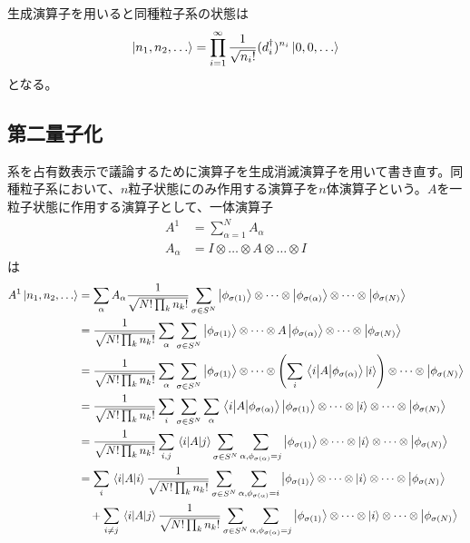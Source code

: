     生成演算子を用いると同種粒子系の状態は
        \[\ket{n_1, n_2, \dots} = \prod_{i = 1}^\infty \frac{1}{\sqrt{n_i!}} (d_i^\dagger)^{n_i} \ket{0, 0, \dots}\]
    となる。

\subsection{第二量子化}
    系を占有数表示で議論するために演算子を生成消滅演算子を用いて書き直す。同種粒子系において、$n$粒子状態にのみ作用する演算子を$n$体演算子という。$A$を一粒子状態に作用する演算子として、一体演算子
    \begin{align*}
        A^1 &= \sum_{\alpha = 1}^N A_\alpha\\
        A_\alpha &= I \otimes \dots \otimes A \otimes \dots \otimes I
    \end{align*}
    は
    \begin{align*}
        A^1\ket{n_1, n_2, \dots}
            &= \sum_\alpha A_\alpha \frac{1}{\sqrt{N! \prod_k n_k!}} \sum_{\sigma \in S^N} \ket{\phi_{\sigma(1)}} \otimes \dots \otimes \ket{\phi_{\sigma(\alpha)}} \otimes \dots \otimes \ket{\phi_{\sigma(N)}}\\
            &= \frac{1}{\sqrt{N! \prod_k n_k!}} \sum_\alpha \sum_{\sigma \in S^N} \ket{\phi_{\sigma(1)}} \otimes \dots \otimes A\ket{\phi_{\sigma(\alpha)}} \otimes \dots \otimes \ket{\phi_{\sigma(N)}}\\
            &= \frac{1}{\sqrt{N! \prod_k n_k!}} \sum_\alpha \sum_{\sigma \in S^N} \ket{\phi_{\sigma(1)}} \otimes \dots \otimes \left(\sum_i \mel{i}{A}{\phi_{\sigma(\alpha)}} \ket{i}\right) \otimes \dots \otimes \ket{\phi_{\sigma(N)}}\\
            &= \frac{1}{\sqrt{N! \prod_k n_k!}} \sum_i \sum_{\sigma \in S^N} \sum_\alpha \mel{i}{A}{\phi_{\sigma(\alpha)}} \ket{\phi_{\sigma(1)}} \otimes \dots \otimes \ket{i} \otimes \dots \otimes \ket{\phi_{\sigma(N)}}\\
            &= \frac{1}{\sqrt{N! \prod_k n_k!}} \sum_{i, j} \mel{i}{A}{j} \sum_{\sigma \in S^N} \sum_{\alpha, \phi_{\sigma(\alpha)} = j} \ket{\phi_{\sigma(1)}} \otimes \dots \otimes \ket{i} \otimes \dots \otimes \ket{\phi_{\sigma(N)}}\\
            &= \sum_i \mel{i}{A}{i} \frac{1}{\sqrt{N! \prod_k n_k!}} \sum_{\sigma \in S^N} \sum_{\alpha, \phi_{\sigma(\alpha)} = i} \ket{\phi_{\sigma(1)}} \otimes \dots \otimes \ket{i} \otimes \dots \otimes \ket{\phi_{\sigma(N)}}\\
            &\quad + \sum_{i \neq j} \mel{i}{A}{j} \frac{1}{\sqrt{N! \prod_k n_k!}} \sum_{\sigma \in S^N} \sum_{\alpha, \phi_{\sigma(\alpha)} = j} \ket{\phi_{\sigma(1)}} \otimes \dots \otimes \ket{i} \otimes \dots \otimes \ket{\phi_{\sigma(N)}}
    \end{align*}
